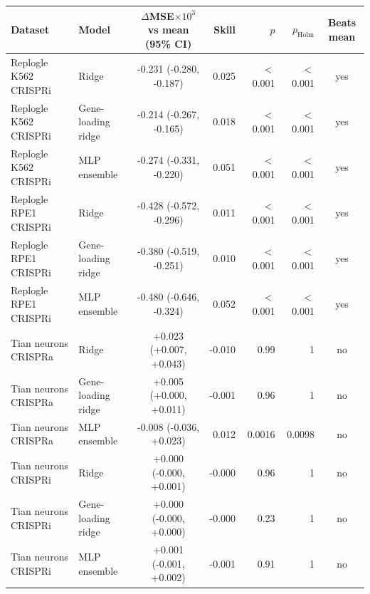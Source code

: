 \begin{tabular}{llcrrrc}
\toprule
Dataset & Model & $\Delta$MSE$\times10^{3}$ vs mean (95\% CI) & Skill & $p$ & $p_{\mathrm{Holm}}$ & Beats mean \\
\midrule
Replogle K562 CRISPRi & Ridge & -0.231 (-0.280, -0.187) & 0.025 & $<$0.001 & $<$0.001 & yes \\
Replogle K562 CRISPRi & Gene-loading ridge & -0.214 (-0.267, -0.165) & 0.018 & $<$0.001 & $<$0.001 & yes \\
Replogle K562 CRISPRi & MLP ensemble & -0.274 (-0.331, -0.220) & 0.051 & $<$0.001 & $<$0.001 & yes \\
Replogle RPE1 CRISPRi & Ridge & -0.428 (-0.572, -0.296) & 0.011 & $<$0.001 & $<$0.001 & yes \\
Replogle RPE1 CRISPRi & Gene-loading ridge & -0.380 (-0.519, -0.251) & 0.010 & $<$0.001 & $<$0.001 & yes \\
Replogle RPE1 CRISPRi & MLP ensemble & -0.480 (-0.646, -0.324) & 0.052 & $<$0.001 & $<$0.001 & yes \\
Tian neurons CRISPRa & Ridge & +0.023 (+0.007, +0.043) & -0.010 & 0.99 & 1 & no \\
Tian neurons CRISPRa & Gene-loading ridge & +0.005 (+0.000, +0.011) & -0.001 & 0.96 & 1 & no \\
Tian neurons CRISPRa & MLP ensemble & -0.008 (-0.036, +0.023) & 0.012 & 0.0016 & 0.0098 & no \\
Tian neurons CRISPRi & Ridge & +0.000 (-0.000, +0.001) & -0.000 & 0.96 & 1 & no \\
Tian neurons CRISPRi & Gene-loading ridge & +0.000 (-0.000, +0.000) & -0.000 & 0.23 & 1 & no \\
Tian neurons CRISPRi & MLP ensemble & +0.001 (-0.001, +0.002) & -0.001 & 0.91 & 1 & no \\
\bottomrule
\end{tabular}